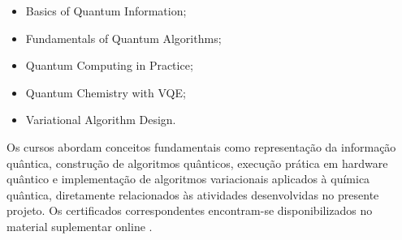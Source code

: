\begin{itemize}
\item Basics of Quantum Information;
\item Fundamentals of Quantum Algorithms;
\item Quantum Computing in Practice;
\item Quantum Chemistry with VQE;
\item Variational Algorithm Design.
\end{itemize}

Os cursos abordam conceitos fundamentais como representação da informação
quântica, construção de algoritmos quânticos, execução prática em hardware
quântico e implementação de algoritmos variacionais aplicados à química
quântica, diretamente relacionados às atividades desenvolvidas no presente
projeto. Os certificados correspondentes encontram-se disponibilizados
no material suplementar online \cite{leao2026material_suplementar}.